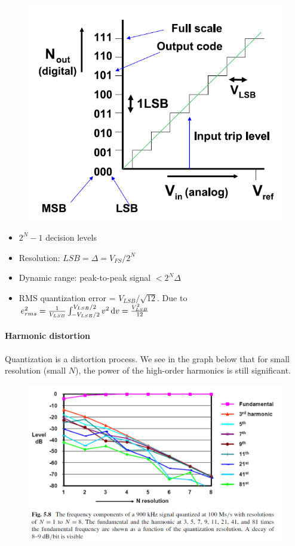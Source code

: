 \begin{minipage}[c]{0.45 \linewidth}
\begin{figure}[H]
    \centering
    \includegraphics[width = 0.7 \textwidth]{L5/img/quantization2.PNG}
\end{figure}
\end{minipage}\hfill
\begin{minipage}[c]{0.45 \linewidth}
\begin{itemize}
    \item $2^N- 1$ decision levels
    \item Resolution: $LSB = \Delta = V_{FS}/2^N$
    \item Dynamic range: peak-to-peak signal $< 2^N \Delta $ 
    \item RMS quantization error = $V_{LSB}/\sqrt{12}$. Due to $e_{rms}^2 = \frac{1}{V_{LSB}}\int_{-V_{LSB}/2}^{V_{LSB}/2} v^2 \operatorname{d}\! v = \frac{V_{LSB}^2}{12} $
\end{itemize}
\end{minipage}

\paragraph{Harmonic distortion}

Quantization is a distortion process. We see in the graph below that for small resolution (small $N$), the power of the high-order harmonics is still significant.
\begin{figure}[H]
    \centering
    \includegraphics[width = 0.7 \textwidth]{L5/img/harmonic-distortion.PNG}
\end{figure}

